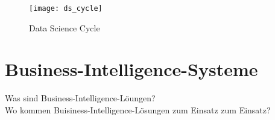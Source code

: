 \begin{figure}[ht]
    \centering
        \texttt{[image: ds\_cycle]}
        \caption{Data Science Cycle}
        \label{fig:data science}
\end{figure}




\section{Business-Intelligence-Systeme}

Was sind Business-Intelligence-Löungen?\\
Wo kommen Buisiness-Intelligence-Lösungen zum Einsatz zum Einsatz?
